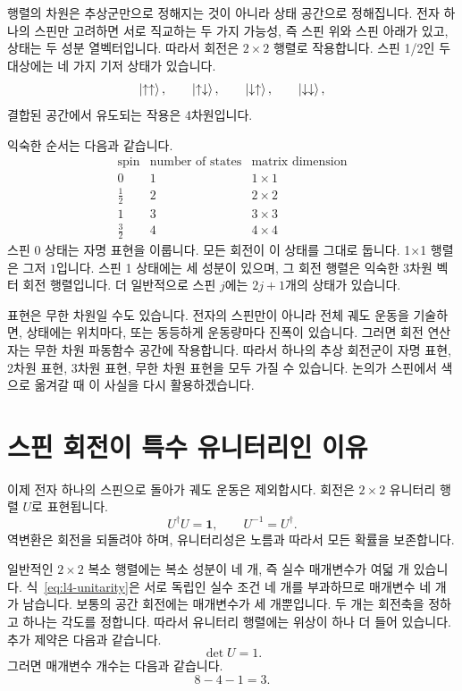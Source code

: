 행렬의 차원은 추상군만으로 정해지는 것이 아니라 상태 공간으로 정해집니다. 전자 하나의 스핀만 고려하면 서로 직교하는 두 가지 가능성, 즉 스핀 위와 스핀 아래가 있고, 상태는 두 성분 열벡터입니다. 따라서 회전은 \(2\times2\) 행렬로 작용합니다. 스핀 1/2인 두 대상에는 네 가지 기저 상태가 있습니다.
\begin{equation}
\left\lvert\uparrow\uparrow\right\rangle,\qquad
\left\lvert\uparrow\downarrow\right\rangle,\qquad
\left\lvert\downarrow\uparrow\right\rangle,\qquad
\left\lvert\downarrow\downarrow\right\rangle,
\end{equation}
결합된 공간에서 유도되는 작용은 4차원입니다.

익숙한 순서는 다음과 같습니다.
\begin{equation}
\begin{array}{c|c|c}
\text{spin} & \text{number of states} & \text{matrix dimension}\\
\hline
0 & 1 & 1\times1\\
\frac12 & 2 & 2\times2\\
1 & 3 & 3\times3\\
\frac32 & 4 & 4\times4
\end{array}
\end{equation}
스핀 0 상태는 자명 표현을 이룹니다. 모든 회전이 이 상태를 그대로 둡니다. 1×1 행렬은 그저 \(1\)입니다. 스핀 1 상태에는 세 성분이 있으며, 그 회전 행렬은 익숙한 3차원 벡터 회전 행렬입니다. 더 일반적으로 스핀 \(j\)에는 \(2j+1\)개의 상태가 있습니다.

표현은 무한 차원일 수도 있습니다. 전자의 스핀만이 아니라 전체 궤도 운동을 기술하면, 상태에는 위치마다, 또는 동등하게 운동량마다 진폭이 있습니다. 그러면 회전 연산자는 무한 차원 파동함수 공간에 작용합니다. 따라서 하나의 추상 회전군이 자명 표현, 2차원 표현, 3차원 표현, 무한 차원 표현을 모두 가질 수 있습니다. 논의가 스핀에서 색으로 옮겨갈 때 이 사실을 다시 활용하겠습니다.

\section{스핀 회전이 특수 유니터리인 이유}

이제 전자 하나의 스핀으로 돌아가 궤도 운동은 제외합시다. 회전은 \(2\times2\) 유니터리 행렬 \(U\)로 표현됩니다.
\begin{equation}
U^\dagger U=\boldsymbol 1,
\qquad
U^{-1}=U^\dagger.
\label{eq:l4-unitarity}
\end{equation}
역변환은 회전을 되돌려야 하며, 유니터리성은 노름과 따라서 모든 확률을 보존합니다.

일반적인 \(2\times2\) 복소 행렬에는 복소 성분이 네 개, 즉 실수 매개변수가 여덟 개 있습니다. 식~\eqref{eq:l4-unitarity}은 서로 독립인 실수 조건 네 개를 부과하므로 매개변수 네 개가 남습니다. 보통의 공간 회전에는 매개변수가 세 개뿐입니다. 두 개는 회전축을 정하고 하나는 각도를 정합니다. 따라서 유니터리 행렬에는 위상이 하나 더 들어 있습니다. 추가 제약은 다음과 같습니다.
\begin{equation}
\det U=1.
\label{eq:l4-det-one}
\end{equation}
그러면 매개변수 개수는 다음과 같습니다.
\begin{equation}
8-4-1=3.
\end{equation}


